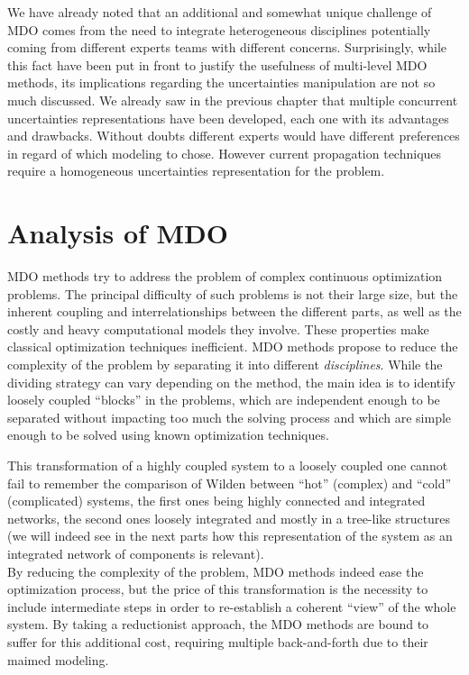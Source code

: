 We have already noted that an additional and somewhat unique challenge of MDO comes from the need to integrate heterogeneous disciplines potentially coming from different experts teams with different concerns. Surprisingly, while this fact have been put in front to justify the usefulness of multi-level MDO methods, its implications regarding the uncertainties manipulation are not so much discussed. We already saw in the previous chapter that multiple concurrent uncertainties representations have been developed, each one with its advantages and drawbacks. Without doubts different experts would have different preferences in regard of which modeling to chose. However current propagation techniques require a homogeneous uncertainties representation for the problem.

\section{Analysis of MDO}

MDO methods try to address the problem of complex continuous optimization problems. The principal difficulty of such problems is not their large size, but the inherent coupling and interrelationships between the different parts, as well as the costly and heavy computational models they involve. These properties make classical optimization techniques inefficient. MDO methods propose to reduce the complexity of the problem by separating it into different \emph{disciplines}. While the dividing strategy can vary depending on the method, the main idea is to identify loosely coupled \enquote{blocks} in the problems, which are independent enough to be separated without impacting too much the solving process and which are simple enough to be solved using known optimization techniques.

This transformation of a highly coupled system to a loosely coupled one cannot fail to remember the comparison of Wilden \cite{wilden2003system} between \enquote{hot} (complex) and \enquote{cold} (complicated) systems, the first ones being highly connected and integrated networks, the second ones loosely integrated and mostly in a tree-like structures (we will indeed see in the next parts how this representation of the system as an integrated network of components is relevant).\\
By reducing the complexity of the problem, MDO methods indeed ease the optimization process, but the price of this transformation is the necessity to include intermediate steps in order to re-establish a coherent \enquote{view} of the whole system. By taking a reductionist approach, the MDO methods are bound to suffer for this additional cost, requiring multiple back-and-forth due to their maimed modeling.

